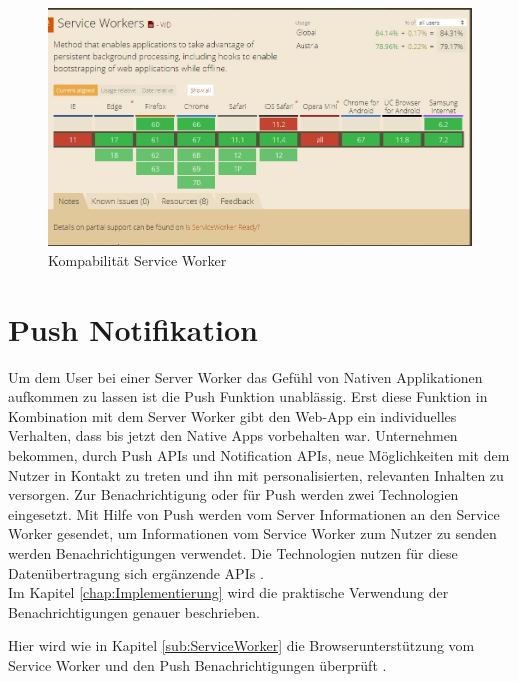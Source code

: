 
\begin{figure}[h]
	\centering
	\includegraphics[width=14cm]{BilderAllgemein/BrowserSW}\medskip
	\caption{Kompabilität Service Worker \cite{BrowserSupport}}
	\label{fig:BrowserSW}
\end{figure}


\section{Push Notifikation}
Um dem User bei einer Server Worker das Gefühl von Nativen Applikationen aufkommen zu lassen ist die Push Funktion unablässig. Erst diese Funktion in Kombination mit dem Server Worker gibt den \acl{Web-App} ein individuelles Verhalten, dass bis jetzt den Native Apps vorbehalten war.
Unternehmen bekommen, durch Push APIs und Notification APIs, neue Möglichkeiten mit dem Nutzer in Kontakt zu treten und ihn mit personalisierten, relevanten Inhalten zu versorgen.
Zur Benachrichtigung oder für Push werden zwei Technologien eingesetzt. Mit Hilfe von Push werden vom Server Informationen an den Service Worker gesendet, um Informationen vom Service Worker zum Nutzer zu senden werden Benachrichtigungen verwendet. Die Technologien nutzen für diese Datenübertragung sich ergänzende APIs \cite{PushNotifikation}. \\
Im Kapitel \ref{chap:Implementierung} wird die praktische Verwendung der Benachrichtigungen genauer beschrieben.  
 

Hier wird wie in Kapitel \ref{sub:ServiceWorker} die Browserunterstützung vom Service Worker und den Push Benachrichtigungen überprüft \cite{PushNotifikation}.
\newpage

